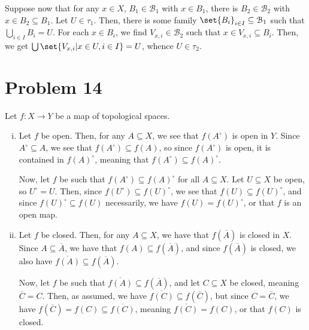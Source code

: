 \documentclass[10pt]{mypackage}
\begin{document}
Suppose now that for any $x\in X$, $B_1\in \mathcal{B}_1$ with $x\in B_1$, there is $B_2\in \mathcal{B}_2$ with $x\in B_2\subseteq B_1$. Let $U\in \tau_1$. Then, there is some family $\set{B_{i}}_{i\in I}\subseteq \mathcal{B}_1$ such that $\bigcup_{i\in I}B_i = U$. For each $x\in B_i$, we find $V_{x,i}\in \mathcal{B}_2$ such that $x\in V_{x,i}\subseteq B_{i}$. Then, we get $\bigcup\set{V_{x,i}| x\in U,i\in I} = U$, whence $U\in \tau_2$.
\section{Problem 14}%
Let $f\colon X\rightarrow Y$ be a map of topological spaces.
\begin{enumerate}[(i)]
  \item Let $f$ be open. Then, for any $A\subseteq X$, we see that $f\left( A^{\circ} \right)$ is open in $Y$. Since $A^{\circ}\subseteq A$, we see that $f\left( A^{\circ} \right)\subseteq f\left( A \right)$, so since $f\left( A^{\circ} \right)$ is open, it is contained in $f\left( A \right)^{\circ}$, meaning that $f\left( A^{\circ} \right)\subseteq f\left( A \right)^{\circ}$.\newline

    Now, let $f$ be such that $f\left( A^{\circ} \right)\subseteq f\left( A \right)^{\circ}$ for all $A\subseteq X$. Let $U\subseteq X$ be open, so $U^{\circ} = U$. Then, since $f\left( U^{\circ} \right)\subseteq f\left( U \right)^{\circ}$, we see that $f\left( U \right)\subseteq f\left( U \right)^{\circ}$, and since $f\left( U \right)^{\circ}\subseteq f\left( U \right)$ necessarily, we have $f\left( U \right) = f\left( U \right)^{\circ}$, or that $f$ is an open map.
  \item Let $f$ be closed. Then, for any $A\subseteq X$, we have that $f\left( \overline{A} \right)$ is closed in $X$. Since $A\subseteq \overline{A}$, we have that $f\left( A \right)\subseteq f\left( \overline{A} \right)$, and since $f\left( \overline{A} \right)$ is closed, we also have $ \overline{f\left( A \right)}\subseteq f\left( \overline{A} \right) $.\newline

    Now, let $f$ be such that $ \overline{f\left( A \right)}\subseteq f\left( \overline{A} \right) $, and let $C\subseteq X$ be closed, meaning $ \overline{C} = C $. Then, as assumed, we have $ \overline{f\left( C \right)}\subseteq f\left( \overline{C} \right)$, but since $C = \overline{C}$, we have $f\left( \overline{C} \right) = f\left( C \right) \subseteq \overline{f\left( C \right)}$, meaning $ \overline{f\left( C \right)} = f\left( C \right) $, or that $f\left( C \right)$ is closed.
\end{enumerate}
\end{document}
